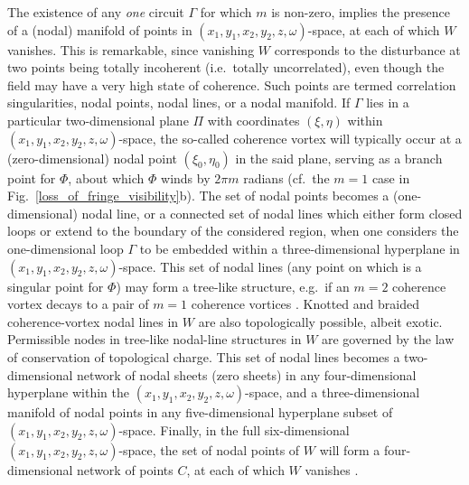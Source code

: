 \documentclass[%
 reprint,
 amsmath,amssymb,
 aps,
]{revtex4-1}
\begin{document}
The existence of any {\em one} circuit $\Gamma$ for which $m$ is non-zero, implies the presence of a (nodal) manifold of points in $(x_1,y_1,x_2,y_2,z,\omega)$-space, at each of which $W$ vanishes.  This is remarkable, since vanishing $W$ corresponds to the disturbance at two points being totally incoherent (i.e.~totally uncorrelated), even though the field may have a very high state of coherence. Such points are termed correlation singularities, nodal points, nodal lines, or a nodal manifold.  If $\Gamma$ lies in a particular two-dimensional plane $\Pi$ with coordinates $(\xi,\eta)$ within $(x_1,y_1,x_2,y_2,z,\omega)$-space, the so-called coherence vortex \cite{GburVisser2003} will typically occur at a (zero-dimensional) nodal point $(\xi_0,\eta_0)$ in the said plane, serving as a branch point for $\Phi$, about which $\Phi$ winds by $2 \pi m$ radians (cf.~the $m=1$ case in Fig.~\ref{loss_of_fringe_visibility}b).  The set of nodal points becomes a (one-dimensional) nodal line, or a connected set of nodal lines which either form closed loops or extend to the boundary of the considered region, when one considers the one-dimensional loop $\Gamma$ to be embedded within a three-dimensional hyperplane in  $(x_1,y_1,x_2,y_2,z,\omega)$-space.  This set of nodal lines (any point on which is a singular point for $\Phi$) may form a tree-like structure, e.g.~if an $m=2$ coherence vortex decays to a pair of $m=1$ coherence vortices \cite{TopologicalReactionsCohVortices,GburSPIE}.  Knotted and braided coherence-vortex nodal lines in $W$ are also topologically possible, albeit exotic.  Permissible nodes in tree-like nodal-line structures in $W$ are governed by the law of conservation of topological charge.  This set of nodal lines becomes a two-dimensional network of nodal sheets (zero sheets) in any four-dimensional hyperplane within the $(x_1,y_1,x_2,y_2,z,\omega)$-space, and a three-dimensional manifold of nodal points in any five-dimensional hyperplane subset of $(x_1,y_1,x_2,y_2,z,\omega)$-space.  Finally, in the full six-dimensional $(x_1,y_1,x_2,y_2,z,\omega)$-space, the set of nodal points of $W$ will form a four-dimensional network of points $C$, at each of which $W$ vanishes \cite{Marasinghe2010}.  
\end{document}
